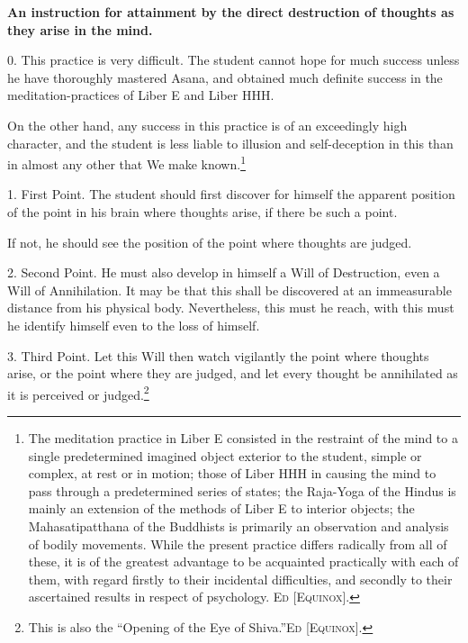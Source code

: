 
\textbf{An instruction for attainment by the direct destruction of thoughts as they arise in the mind.}

0. This practice is very difficult. The student cannot hope for much success unless he have thoroughly mastered Asana, and obtained much definite success in the meditation-practices of Liber E and Liber HHH.

On the other hand, any success in this practice is of an exceedingly high character, and the student is less liable to illusion and self-deception in this than in almost any other that We make known.\footnote{The meditation practice in Liber E consisted in the restraint of the mind to a single predetermined imagined object exterior to the student, simple or complex, at rest or in motion; those of Liber HHH in causing the mind to pass through a predetermined series of states; the Raja-Yoga of the Hindus is mainly an extension of the methods of Liber Ε to interior objects; the Mahasatipatthana of the Buddhists is primarily an observation and analysis of bodily movements. While the present practice differs radically from all of these, it is of the greatest advantage to be acquainted practically with each of them, with regard firstly to their incidental difficulties, and secondly to their ascertained results in respect of psychology. \textsc{Ed [Equinox]}.}

1. First Point. The student should first discover for himself the apparent position of the point in his brain where thoughts arise, if there be such a point.

If not, he should see the position of the point where thoughts are judged.

2. Second Point. He must also develop in himself a Will of Destruction, even a Will of Annihilation. It may be that this shall be discovered at an immeasurable distance from his physical body. Nevertheless, this must he reach, with this must he identify himself even to the loss of himself.

3. Third Point. Let this Will then watch vigilantly the point where thoughts arise, or the point where they are judged, and let every thought be annihilated as it is perceived or judged.\footnote{This is also the \enquote{Opening of the Eye of Shiva.}\footnotemark \textsc{Ed [Equinox]}.}

